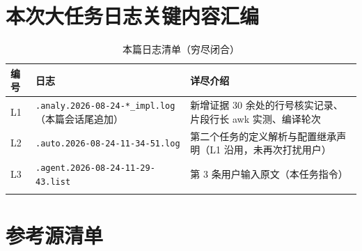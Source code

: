 \documentclass[UTF8]{ctexart}
\begin{document}
\section{本次大任务日志关键内容汇编}

\begin{xltabular}{\textwidth}{llX}
\toprule
编号 & 日志 & 详尽介绍 \\
\midrule
\endhead
L1 & \texttt{\nolinkurl{.analy.2026-08-24-*_impl.log}}（本篇会话尾追加） & 新增证据 30 余处的行号核实记录、片段行长 awk 实测、编译轮次 \\
L2 & \texttt{\nolinkurl{.auto.2026-08-24-11-34-51.log}} & 第二个任务的定义解析与配置继承声明（L1 沿用，未再次打扰用户） \\
L3 & \texttt{\nolinkurl{.agent.2026-08-24-11-29-43.list}} & 第 3 条用户输入原文（本任务指令） \\
\bottomrule
\caption{本篇日志清单（穷尽闭合）}
\end{xltabular}

\section{参考源清单}\label{sec:refs2}
\end{document}
